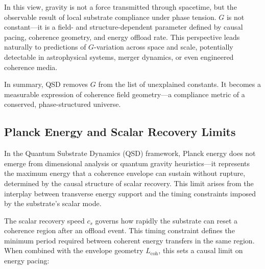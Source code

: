 \documentclass[entropy,article,submit,pdftex,moreauthors]{Definitions/mdpi}
\begin{document}
\begin{center}
\end{center}

In this view, gravity is not a force transmitted through spacetime, but the observable result of local substrate compliance under phase tension. $G$ is not constant—it is a field- and structure-dependent parameter defined by causal pacing, coherence geometry, and energy offload rate. This perspective leads naturally to predictions of $G$-variation across space and scale, potentially detectable in astrophysical systems, merger dynamics, or even engineered coherence media.

\medskip
In summary, QSD removes $G$ from the list of unexplained constants. It becomes a measurable expression of coherence field geometry—a compliance metric of a conserved, phase-structured universe.

\subsection{Planck Energy and Scalar Recovery Limits}

In the Quantum Substrate Dynamics (QSD) framework, Planck energy does not emerge from dimensional analysis or quantum gravity heuristics—it represents the maximum energy that a coherence envelope can sustain without rupture, determined by the causal structure of scalar recovery. This limit arises from the interplay between transverse energy support and the timing constraints imposed by the substrate’s scalar mode.

The scalar recovery speed $c_s$ governs how rapidly the substrate can reset a coherence region after an offload event. This timing constraint defines the minimum period required between coherent energy transfers in the same region. When combined with the envelope geometry $L_{\text{coh}}$, this sets a causal limit on energy pacing:
\end{document}
